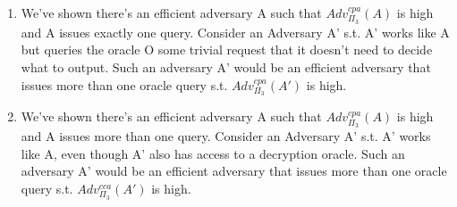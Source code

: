 \documentclass[]{article}
\begin{document}
\begin{enumerate}[label=(\alph*)]
	\item We've shown there's an efficient adversary A such that $Adv_{\Pi_3}^{cpa}(A)$ is high and A issues exactly one query. Consider an Adversary A' s.t. A' works like A but queries the oracle O some trivial request that it doesn't need to decide what to output. Such an adversary A' would be an efficient adversary that issues more than one oracle query s.t. $Adv_{\Pi_3}^{cpa}(A')$ is high. 
	\item We've shown there's an efficient adversary A such that $Adv_{\Pi_3}^{cpa}(A)$ is high and A issues more than one query. Consider an Adversary A' s.t. A' works like A, even though A' also has access to a decryption oracle. Such an adversary A' would be an efficient adversary that issues more than one oracle query s.t. $Adv_{\Pi_3}^{cca}(A')$ is high. 
\end{enumerate}
\end{document}
